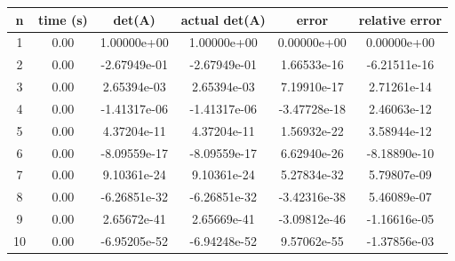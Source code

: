\documentclass[12pt]{article}
\begin{document}
\begin{tabular}{ c | c | c | c | c | c }
n & time (s) & det(A) & actual det(A) & error & relative error \\
\hline
1 & 0.00 & 1.00000e+00 & 1.00000e+00 & 0.00000e+00 & 0.00000e+00 \\
2 & 0.00 & -2.67949e-01 & -2.67949e-01 & 1.66533e-16 & -6.21511e-16 \\
3 & 0.00 & 2.65394e-03 & 2.65394e-03 & 7.19910e-17 & 2.71261e-14 \\
4 & 0.00 & -1.41317e-06 & -1.41317e-06 & -3.47728e-18 & 2.46063e-12 \\
5 & 0.00 & 4.37204e-11 & 4.37204e-11 & 1.56932e-22 & 3.58944e-12 \\
6 & 0.00 & -8.09559e-17 & -8.09559e-17 & 6.62940e-26 & -8.18890e-10 \\
7 & 0.00 & 9.10361e-24 & 9.10361e-24 & 5.27834e-32 & 5.79807e-09 \\
8 & 0.00 & -6.26851e-32 & -6.26851e-32 & -3.42316e-38 & 5.46089e-07 \\
9 & 0.00 & 2.65672e-41 & 2.65669e-41 & -3.09812e-46 & -1.16616e-05 \\
10 & 0.00 & -6.95205e-52 & -6.94248e-52 & 9.57062e-55 & -1.37856e-03 \\
\end{tabular}
\newline
\newline
\end{document}
